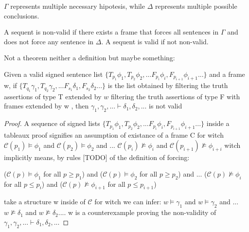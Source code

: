 \documentclass[runningheads]{llncs}
\begin{document}
$\Gamma $ represents multiple necessary hipotesis, while $\Delta$ represents multiple possible conclusions. 

\begin {definition}
A sequent is non-valid if there exists a frame  
that forces all sentences in $\Gamma$ and does not force any sentence in $\Delta$. A sequent is valid if not non-valid.
\end {definition}



Not a theorem neither a definition but maybe something:\\

\begin{theorem}
Given a valid signed sentence list $\{ T_{p_1}\phi_{1}, T_{p_2}\phi_{2}, ... F_{p_i}\phi_{i}, F_{p_{i+1}}\phi_{i+1}...\} $ and a frame w, 
if $\{ T_{q_1}\gamma_{1}, T_{q_2}\gamma_{2} , ... F_{s_1}\delta_{1}, F_{s_{2}}\delta_{2}...\}$ is the list obtained by filtering the truth assertions of type T extended by $w$ 
filtering the truth assertions of type F with frames extended by w , then $\gamma_{1}, \gamma_{2}, ... \vdash \delta_1, \delta_2, ...$ is not valid
\end{theorem}
\begin{proof}
A sequence of signed lists $\{ T_{p_1}\phi_{1}, T_{p_2}\phi_{2}, ... F_{p_i}\phi_{i}, F_{p_{i+1}}\phi_{i+1}...\} $ 
inside a tableaux proof signifies an assumption of existance of a frame C 
for witch
 $ \mathcal{C}(p_1) \vDash \phi_{1}$ and $ \mathcal{C}(p_{2}) \vDash \phi_{2}$ and ... $ \mathcal{C}(p_{i}) \nvDash \phi_{i}$  and $ \mathcal{C}(p_{i+1}) \nvDash \phi_{i+i}$
 witch implicitly means, by rules [TODO] of the definition of forcing: 

 ($ \mathcal{C}(p) \vDash \phi_{1}$ for all $p \geq p_1$) and ($ \mathcal{C}(p) \vDash \phi_{2}$ for all $p \geq p_2$) and ... ($ \mathcal{C}(p) \nvDash \phi_{i}$ for all $p \leq p_{i}$) and ($ \mathcal{C}(p) \nvDash \phi_{i+1}$ for all $p \leq p_{i+1}$)
 
 take a structure w inside of $\mathcal{C}$ for witch we can infer: $ w \vDash \gamma_{1}$ and $ w \vDash \gamma_{2}$ and ... $ w \nvDash \delta_1$  and $ w \nvDash \delta_2 ...$.
 w is a counterexample proving the non-validity of 
$\gamma_{1}, \gamma_{2}, ... \vdash \delta_1, \delta_2, ...$
\end{proof}
\end{document}
